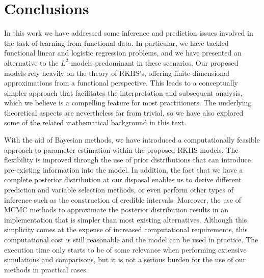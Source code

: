 %
%

\chapter{Conclusions}\label{ch:conclusions}

In this work we have addressed some inference and prediction issues involved in the task of learning from functional data. In particular, we have tackled functional linear and logistic regression problems, and we have presented an alternative to the \(L^2\)-models predominant in these scenarios. Our proposed models rely heavily on the theory of RKHS's, offering finite-dimensional approximations from a functional perspective. This leads to a conceptually simpler approach that facilitates the interpretation and subsequent analysis, which we believe is a compelling feature for most practitioners. The underlying theoretical aspects are nevertheless far from trivial, so we have also explored some of the related mathematical background in this text.

With the aid of Bayesian methods, we have introduced a computationally feasible approach to parameter estimation within the proposed RKHS models. The flexibility is improved through the use of prior distributions that can introduce pre-existing information into the model. In addition, the fact that we have a complete posterior distribution at our disposal enables us to derive different prediction and variable selection methods, or even perform other types of inference such as the construction of credible intervals. Moreover, the use of MCMC methods to approximate the posterior distribution results in an implementation that is simpler than most existing alternatives. Although this simplicity comes at the expense of increased computational requirements, this computational cost is still reasonable and the model can be used in practice. The execution time only starts to be of some relevance when performing extensive simulations and comparisons, but it is not a serious burden for the use of our methods in practical cases.

